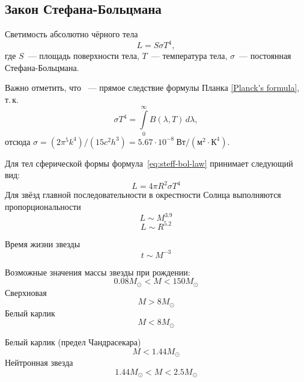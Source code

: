 \subsection{Закон Стефана-Больцмана}
Светимость абсолютно чёрного тела
	\begin{equation}
	L = S \sigma T^4,
	\label{eq:steff-bol-law}
\end{equation}
 где $S$~--- площадь поверхности тела, $T$~--- температура тела, $\sigma$~--- постоянная Стефана-Больцмана.
  
Важно отметить, что ~--- прямое следствие формулы Планка \eqref{Planck's formula}, т.\,к.\begin{equation}
	\sigma T^4 = \int\limits^\infty_0 B(\lambda, T)\,d\lambda,
\end{equation}
отсюда $\sigma = (2\pi^5k^4)/(15c^2h^3) = 5.67 \cdot 10^{-8}~\text{Вт}/(\text{м}^2\cdot \text{К}^4)$.


Для тел сферической формы формула~\eqref{eq:steff-bol-law} принимает следующий вид:
\begin{equation}
L=4\pi R^2\sigma T^4
\end{equation}
Для звёзд главной последовательности в окрестности Солнца выполняются пропорциональности
\begin{equation}
L\sim M^{3.9}
\end{equation}
\begin{equation}
L\sim R^{5.2}
\end{equation}


Время жизни звезды \begin{equation}
t\sim M^{-3}
\end{equation}

Возможные значения массы звезды при рождении:
\begin{equation}
0.08M_{\odot}<M<150M_{\odot}
\end{equation}
Сверхновая
\begin{equation}
M>8M_{\odot}
\end{equation}
Белый карлик
\begin{equation}
M<8M_{\odot}
\end{equation}
 
Белый карлик (предел Чандрасекара) \begin{equation}
M<1.44M_{\odot}
\end{equation}
Нейтронная звезда
\begin{equation}
1.44M_{\odot}<M<2.5M_{\odot}
\end{equation}

